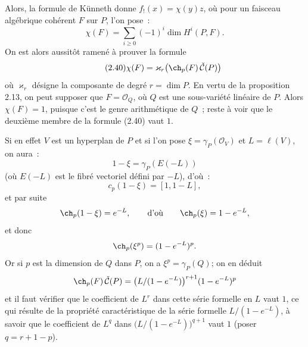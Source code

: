 Alors, la formule de Künneth donne \(f_!(x)=\chi(y)z\), où pour un faisceau algébrique cohérent \(F\) sur \(P\), l'on pose~:
\[
  \chi(F)=\sum_{i\geq 0}(-1)^i\dim H^i(P,F).
\]
On est alors aussitôt ramené à prouver la formule
\begin{equation}\tag{2.40}
  \chi(F)=\varkappa_r\bigl(\ch_p(F)\,\check{\mathcal C}(P)\bigr)
\end{equation}
où \(\varkappa_r\) désigne la composante de degré \(r=\dim P\). En vertu de la proposition 2.13, on peut supposer que \(F=\mathcal O_Q\), où \(Q\) est une sous-variété linéaire de \(P\). Alors \(\chi(F)=1\), puisque c'est le genre arithmétique de \(Q\)~; reste à voir que le deuxième membre de la formule (2.40) vaut \(1\).

Si en effet \(V\) est un hyperplan de \(P\) et si l'on pose \(\xi=\gamma_P(\mathcal O_V)\) et \(L=\ell(V)\), on aura~:
\[
  1-\xi=\gamma_P(E(-L))
\]
(où \(E(-L)\) est le fibré vectoriel défini par \(-L\)), d'où~:
\[
  c_p(1-\xi)=[1,1-L],
\]
et par suite
\[
  \ch_p(1-\xi)=e^{-L},\qquad\text{d'où}\qquad \ch_p(\xi)=1-e^{-L},
\]
et donc
\[
  \ch_p(\xi^p)=(1-e^{-L})^p.
\]
Or si \(p\) est la dimension de \(Q\) dans \(P\), on a \(\xi^p=\gamma_P(Q)\); on en déduit
\[
  \ch_p(F)\,\check{\mathcal C}(P)
  =
  \bigl(L/(1-e^{-L})\bigr)^{r+1}(1-e^{-L})^p
\]
et il faut vérifier que le coefficient de \(L^r\) dans cette série formelle en \(L\) vaut \(1\), ce qui résulte de la propriété caractéristique de la série formelle \(L/(1-e^{-L})\), à savoir que le coefficient de \(L^q\) dans \(\bigl(L/(1-e^{-L})\bigr)^{q+1}\) vaut \(1\) (poser \(q=r+1-p\)).


